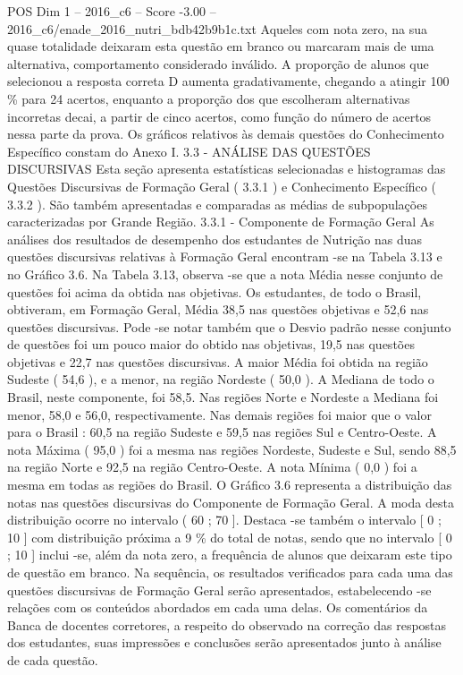 \begin{textsample}{POS Dim 1 – 2016\_c6 – Score -3.00 – 2016\_c6/enade\_2016\_nutri\_bdb42b9b1c.txt}
Aqueles com nota zero, na sua quase totalidade deixaram esta questão em branco ou marcaram mais de uma alternativa, comportamento considerado inválido.
A proporção de alunos que selecionou a resposta correta D aumenta gradativamente, chegando a atingir 100 \% para 24 acertos, enquanto a proporção dos que escolheram alternativas incorretas decai, a partir de cinco acertos, como função do número de acertos nessa parte da prova.
Os gráficos relativos às demais questões do Conhecimento Específico constam do Anexo I. 3.3 - ANÁLISE DAS QUESTÕES DISCURSIVAS Esta seção apresenta estatísticas selecionadas e histogramas das Questões Discursivas de Formação Geral ( 3.3.1 ) e Conhecimento Específico ( 3.3.2 ).
São também apresentadas e comparadas as médias de subpopulações caracterizadas por Grande Região. 3.3.1 - Componente de Formação Geral As análises dos resultados de desempenho dos estudantes de Nutrição nas duas questões discursivas relativas à Formação Geral encontram -se na Tabela 3.13 e no Gráfico 3.6.
Na Tabela 3.13, observa -se que a nota Média nesse conjunto de questões foi acima da obtida nas objetivas.
Os estudantes, de todo o Brasil, obtiveram, em Formação Geral, Média 38,5 nas questões objetivas e 52,6 nas questões discursivas.
Pode -se notar também que o Desvio padrão nesse conjunto de questões foi um pouco maior do obtido nas objetivas, 19,5 nas questões objetivas e 22,7 nas questões discursivas.
A maior Média foi obtida na região Sudeste ( 54,6 ), e a menor, na região Nordeste ( 50,0 ).
A Mediana de todo o Brasil, neste componente, foi 58,5.
Nas regiões Norte e Nordeste a Mediana foi menor, 58,0 e 56,0, respectivamente.
Nas demais regiões foi maior que o valor para o Brasil : 60,5 na região Sudeste e 59,5 nas regiões Sul e Centro-Oeste.
A nota Máxima ( 95,0 ) foi a mesma nas regiões Nordeste, Sudeste e Sul, sendo 88,5 na região Norte e 92,5 na região Centro-Oeste.
A nota Mínima ( 0,0 ) foi a mesma em todas as regiões do Brasil.
O Gráfico 3.6 representa a distribuição das notas nas questões discursivas do Componente de Formação Geral.
A moda desta distribuição ocorre no intervalo ( 60 ; 70 ].
Destaca -se também o intervalo [ 0 ; 10 ] com distribuição próxima a 9 \% do total de notas, sendo que no intervalo [ 0 ; 10 ] inclui -se, além da nota zero, a frequência de alunos que deixaram este tipo de questão em branco.
Na sequência, os resultados verificados para cada uma das questões discursivas de Formação Geral serão apresentados, estabelecendo -se relações com os conteúdos abordados em cada uma delas.
Os comentários da Banca de docentes corretores, a respeito do observado na correção das respostas dos estudantes, suas impressões e conclusões serão apresentados junto à análise de cada questão.

\end{textsample}
